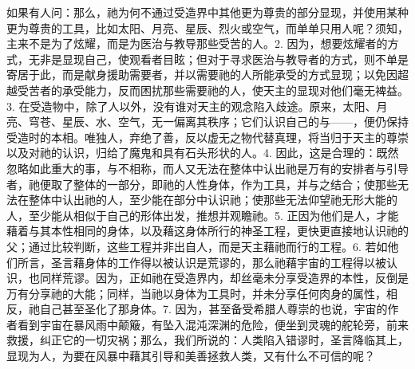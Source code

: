 如果有人问：那么，祂为何不通过受造界中其他更为尊贵的部分显现，并使用某种更为尊贵的工具，比如太阳、月亮、星辰、烈火或空气，而单单只用人呢？须知，主来不是为了炫耀，而是为医治与教导那些受苦的人。2. 因为，想要炫耀者的方式，无非是显现自己，使观看者目眩；但对于寻求医治与教导者的方式，则不单是寄居于此，而是献身援助需要者，并以需要祂的人所能承受的方式显现；以免因超越受苦者的承受能力，反而困扰那些需要祂的人，使天主的显现对他们毫无裨益。3. 在受造物中，除了人以外，没有谁对天主的观念陷入歧途。原来，太阳、月亮、穹苍、星辰、水、空气，无一偏离其秩序；它们认识自己的与——，便仍保持受造时的本相。唯独人，弃绝了善，反以虚无之物代替真理，将当归于天主的尊崇以及对祂的认识，归给了魔鬼和具有石头形状的人。4. 因此，这是合理的：既然忽略如此重大的事，与不相称，而人又无法在整体中认出祂是万有的安排者与引导者，祂便取了整体的一部分，即祂的人性身体，作为工具，并与之结合；使那些无法在整体中认出祂的人，至少能在部分中认识祂；使那些无法仰望祂无形大能的人，至少能从相似于自己的形体出发，推想并观瞻祂。5. 正因为他们是人，才能藉着与其本性相同的身体，以及藉这身体所行的神圣工程，更快更直接地认识祂的父；通过比较判断，这些工程并非出自人，而是天主藉祂而行的工程。6. 若如他们所言，圣言藉身体的工作得以被认识是荒谬的，那么祂藉宇宙的工程得以被认识，也同样荒谬。因为，正如祂在受造界内，却丝毫未分享受造界的本性，反倒是万有分享祂的大能；同样，当祂以身体为工具时，并未分享任何肉身的属性，相反，祂自己甚至圣化了那身体。7. 因为，甚至备受希腊人尊崇的也说，宇宙的作者看到宇宙在暴风雨中颠簸，有坠入混沌深渊的危险，便坐到灵魂的舵轮旁，前来救援，纠正它的一切灾祸；那么，我们所说的：人类陷入错谬时，圣言降临其上，显现为人，为要在风暴中藉其引导和美善拯救人类，又有什么不可信的呢？\par


\section{}

